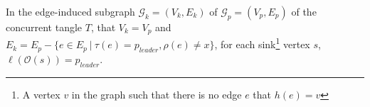 \begin{lemma}
\label{lm:sink}
In the edge-induced subgraph $\mathcal{G}_k=(V_k, E_k)$ of $\mathcal{G}_{p}=(V_p, E_p)$ of the concurrent \keyoneOk tangle $T$, that $V_k = V_p$ and 
$E_k = E_p - \{e \in E_p \ |\ \tau(e) = p_{leader}, \rho(e) \neq x \}$, for each sink\footnote{A vertex $v$ in the graph such that there is no edge $e$ that $h(e) = v$} vertex $s$, $\ell(\mathcal{O}(s)) = p_{leader}$.

\end{lemma}
